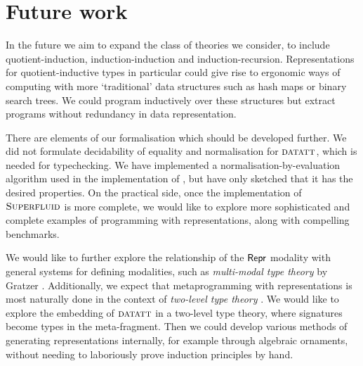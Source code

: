 
\section{Future work}


In the future we aim to expand the class of theories we consider, to include
quotient-induction, induction-induction and induction-recursion. Representations
for quotient-inductive types in particular could give rise to ergonomic ways of
computing with more `traditional' data structures such as hash maps or binary
search trees. We could program inductively over these structures but extract
programs without redundancy in data representation.


There are elements of our formalisation which should be developed further. We
did not formulate decidability of equality and normalisation for ${\textsc{datatt}}$,
which is needed for typechecking. We have implemented a
normalisation-by-evaluation \cite{Altenkirch2020-rm} algorithm used in the
implementation of \superfluid, but have only sketched that it has the
desired properties. On the practical side, once the implementation of $\textsc{Superfluid}$
is more complete, we would like to explore more sophisticated and complete examples
of programming with representations, along with compelling benchmarks.

We would like to further explore the relationship of the $\textsf{Repr}$ modality with
general systems for defining modalities, such as \emph{multi-modal type theory}
by Gratzer \cite{Gratzer2020-kf}. Additionally, we expect that metaprogramming with
representations is most naturally done in the context of \emph{two-level type theory}
\cite{Kovacs2022-vb}. We would like to explore the embedding of ${\textsc{datatt}}$
in a two-level type theory, where signatures become types in the meta-fragment.
Then we could develop various methods of generating representations internally,
for example through algebraic ornaments, without needing to laboriously prove
induction principles by hand.

